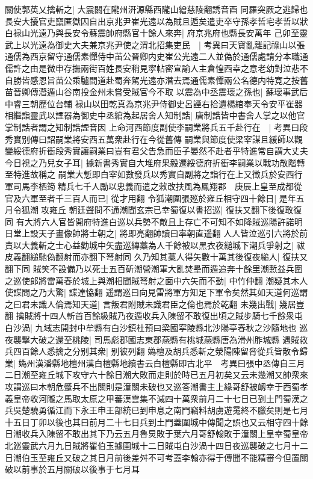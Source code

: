 關使郭英乂擒斬之|{
	大震關在隴州汧源縣西隴山繒慈陵翻誘音酉}
同羅突厥之逃歸也長安大擾官吏竄匿獄囚自出京兆尹崔光遠以為賊且遁矣遣吏卒守孫孝哲宅孝哲以狀白禄山光遠乃與長安令蘇震帥府縣官十餘人來奔|{
	府京兆府也縣長安萬年}
己卯至靈武上以光遠為御史大夫兼京兆尹使之渭北招集吏民　|{
	考異曰天寶亂離記祿山以張通儒為西京留守通儒素憚侍中苖公晉卿内史崔公光遠二人並偽於通儒處請分本職通儒許之由是微申存撫兩街百姓長安稍見寜帖密宣諭人主倉惶西幸之意老幼對泣悲不自勝皆感恩旨苗公乘驢間道赴蜀奔駕光遠亦潛去焉通儒素憚兩公名德内特寛之按舊苗晉卿傳濳遁山谷南投金州未嘗受賊官今不取}
以震為中丞震瓌之孫也|{
	蘇瓌事武后中睿三朝歷位台輔}
禄山以田乾真為京兆尹侍御史呂諲右拾遺楊綰奉天令安平崔器相繼詣靈武以諲器為御史中丞綰為起居舍人知制誥|{
	唐制誥皆中書舍人掌之以他官掌制誥者謂之知制誥諲音因}
上命河西節度副使李嗣業將兵五千赴行在　|{
	考異曰段秀實别傳曰詔嗣業將安西五萬衆赴行在今從舊傳}
嗣業與節度使梁宰謀且緩師以觀變綏德府折衝段秀實讓嗣業曰豈有君父告急而臣子晏然不赴者乎特進常自謂大丈夫今日視之乃兒女子耳|{
	據新書秀實自大堆府果毅遷綏德府折衝李嗣業以戰功散階轉至特進故稱之}
嗣業大慙即白宰如數發兵以秀實自副將之詣行在上又徵兵於安西行軍司馬李栖筠精兵七千人勵以忠義而遣之敕改扶風為鳳翔郡　庚辰上皇至成都從官及六軍至者千三百人而已|{
	從才用翻}
令狐潮圍張廵於雍丘相守四十餘日|{
	是年五月令狐潮攻雍丘}
朝廷聲問不通潮聞玄宗已幸蜀復以書招巡|{
	復扶又翻下後復敢復同}
有大將六人官皆開府特進白巡以兵勢不敵且上存亡不可知不如降賊巡陽許諾明日堂上設天子畫像帥將士朝之|{
	將即亮翻帥讀曰率朝直遥翻}
人人皆泣巡引六將於前責以大義斬之士心益勸城中矢盡巡縳藁為人千餘被以黑衣夜縋城下潮兵爭射之|{
	祓皮義翻縋馳偽翻射而亦翻下弩射同}
久乃知其藁人得矢數十萬其後復夜縋人|{
	復扶又翻下同}
賊笑不設備乃以死士五百斫潮營潮軍大亂焚壘而遁追奔十餘里潮慙益兵圍之巡使郎將雷萬春於城上與潮相聞賊弩射之面中六矢而不動|{
	中竹仲翻}
潮疑其木人使諜問之乃大驚|{
	諜達恊翻}
遥謂巡曰向見雷將軍方知足下軍令矣然其如天道何巡謂之曰君未識人倫焉知天道|{
	言叛君附賊未識君臣之倫也焉於乾翻}
未幾出戰|{
	幾居豈翻}
擒賊將十四人斬首百餘級賊乃夜遁收兵入陳留不敢復出頃之賊步騎七千餘衆屯白沙渦|{
	九域志開封中牟縣有白沙鎮杜預曰梁國寜陵縣北沙陽亭春秋之沙隨地也}
巡夜襲撃大破之還至桃陵|{
	司馬彪郡國志東郡燕縣有桃城燕縣唐為滑州胙城縣}
遇賊救兵四百餘人悉擒之分别其衆|{
	别彼列翻}
媯檀及胡兵悉斬之滎陽陳留脅從兵皆散令歸業|{
	媯州漢潘縣地檀州漢白檀縣地續書云白檀縣即古北平　考異曰張中丞傳自三月二日潮至雍丘城下攻守六十餘日潮大敗而走則於時已五月初矣又云未幾潮又帥衆來攻謂巡曰木朝危蹙兵不出關則是潼關未破也又巡答潮書主上緣哥舒被衂幸于西蜀孝義皇帝收河隴之馬取太原之甲蕃漢雲集不減四十萬衆前月二十七日已到土門蜀漢之兵吳楚驍勇循江而下永王申王部統已到申息之南門竊料胡虜遊䰟終不臘矣則是七月十五日丁卯以後也其曰前月二十七日兵到土門蓋圍城中傳聞之誤也又云相守四十餘日潮收兵入陳留不敢出其下乃云五月魯炅敗于葉六月哥舒翰敗于潼關上皇幸蜀皇帝北廵靈武六月九日賊將瞿伯玉據圉城十二日賊屯白沙渦十四日夜巡襲破之七月十二日潮伯玉至雍丘又破之其日月前後差舛不可考蓋李翰亦得于傳聞不能精審今但置關破以前事於五月關破以後事于七月耳}
